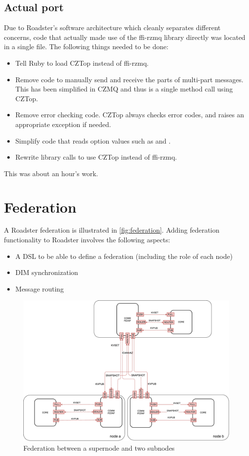\subsection{Actual port}
Due to Roadster's software architecture which cleanly separates different concerns, code that actually made use
of the ffi-rzmq library directly was located in a single file. The following
things needed to be done:

\begin{itemize}
\item Tell Ruby to load CZTop instead of ffi-rzmq.
\item Remove code to manually send and receive the parts of multi-part messages. This has been simplified
in CZMQ and thus is a single method call using CZTop.
\item Remove error checking code. CZTop always checks error codes, and raises
an appropriate exception if needed.
\item Simplify code that reads option values such as  and .
\item Rewrite library calls to use CZTop instead of ffi-rzmq.
\end{itemize}

This was about an hour's work.

\section{Federation}\label{sec:approach:federation}
A Roadster federation is illustrated in \autoref{fig:federation}. Adding federation
functionality to Roadster involves the following aspects:
\begin{itemize}
	\item A \gls{DSL} to be able to define a federation (including the role of each node)
	\item DIM synchronization
	\item Message routing
\end{itemize}

\begin{figure}[]
	\includegraphics[width=\textwidth]{img/federation_protocol.pdf}
	\caption{Federation between a supernode and two subnodes}
	\label{fig:federation}
\end{figure}

